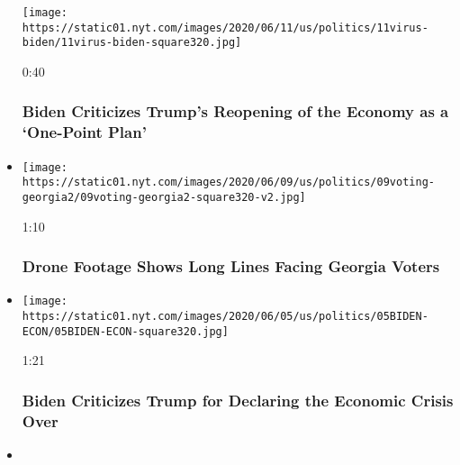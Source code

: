 \begin{itemize}
  \texttt{[image: https://static01.nyt.com/images/2020/06/11/us/politics/11virus-biden/11virus-biden-square320.jpg]}

  0:40

  \hypertarget{biden-criticizes-trumps-reopening-of-the-economy-as-a-one-point-plan}{%
  \subsubsection{Biden Criticizes Trump's Reopening of the Economy as a
  `One-Point
  Plan'}\label{biden-criticizes-trumps-reopening-of-the-economy-as-a-one-point-plan}}
\item
  \href{https://www.nytimes.com/video/us/100000007182268/georgia-election-day-atlanta.html?action=click\&module=video-series-bar\&region=header\&pgtype=Article\&playlistId=video/2020-Elections}{}

  \texttt{[image: https://static01.nyt.com/images/2020/06/09/us/politics/09voting-georgia2/09voting-georgia2-square320-v2.jpg]}

  1:10

  \hypertarget{drone-footage-shows-long-lines-facing-georgia-voters}{%
  \subsubsection{Drone Footage Shows Long Lines Facing Georgia
  Voters}\label{drone-footage-shows-long-lines-facing-georgia-voters}}
\item
  \href{https://www.nytimes.com/video/us/100000007177074/biden-trump-economy-george-floyd.html?action=click\&module=video-series-bar\&region=header\&pgtype=Article\&playlistId=video/2020-Elections}{}

  \texttt{[image: https://static01.nyt.com/images/2020/06/05/us/politics/05BIDEN-ECON/05BIDEN-ECON-square320.jpg]}

  1:21

  \hypertarget{biden-criticizes-trump-for-declaring-the-economic-crisis-over}{%
  \subsubsection{Biden Criticizes Trump for Declaring the Economic
  Crisis
  Over}\label{biden-criticizes-trump-for-declaring-the-economic-crisis-over}}
\item
  \href{https://www.nytimes.com/video/us/elections/100000007169461/watch-live-biden-visits-philadelphia.html?action=click\&module=video-series-bar\&region=header\&pgtype=Article\&playlistId=video/2020-Elections}{}


\end{itemize}
